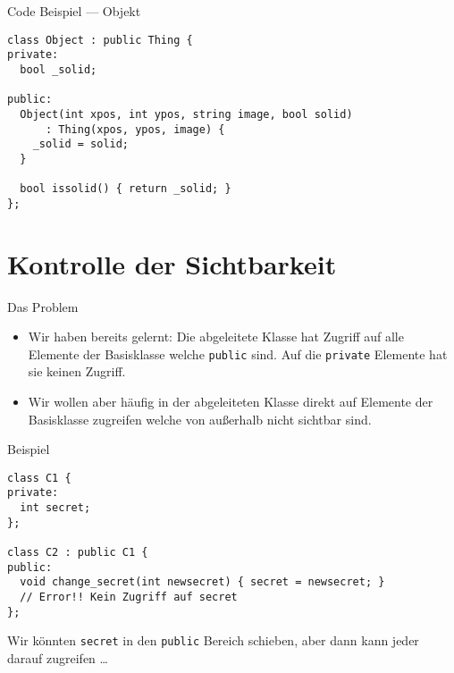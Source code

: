 \documentclass[presentation]{beamer}
\begin{document}
\begin{frame}[label={sec:org2843c20},fragile]{Code Beispiel --- Objekt}
 \begin{verbatim}
class Object : public Thing {
private:
  bool _solid;

public:
  Object(int xpos, int ypos, string image, bool solid)
      : Thing(xpos, ypos, image) {
    _solid = solid;
  }

  bool issolid() { return _solid; }
};
\end{verbatim}
\end{frame}
\section{Kontrolle der Sichtbarkeit}
\label{sec:orgc9f5441}
\begin{frame}[label={sec:orgf44c455},fragile]{Das Problem}
 \begin{itemize}
\item Wir haben bereits gelernt: Die abgeleitete Klasse hat Zugriff auf
alle Elemente der Basisklasse welche {\color{solarizedYellow}\verb!public!} sind. Auf die
{\color{solarizedYellow}\verb!private!} Elemente hat sie \alert{keinen} Zugriff.
\item Wir wollen aber häufig in der abgeleiteten Klasse direkt auf
Elemente der Basisklasse zugreifen welche von außerhalb nicht
sichtbar sind.
\end{itemize}
\begin{exampleblock}{Beispiel}
\begin{verbatim}
class C1 {
private:
  int secret;
};

class C2 : public C1 {
public:
  void change_secret(int newsecret) { secret = newsecret; }
  // Error!! Kein Zugriff auf secret
};
\end{verbatim}
Wir könnten {\color{solarizedYellow}\verb!secret!} in den {\color{solarizedYellow}\verb!public!} Bereich schieben, aber dann kann
jeder darauf zugreifen \ldots{}
\end{exampleblock}
\end{frame}
\end{document}
